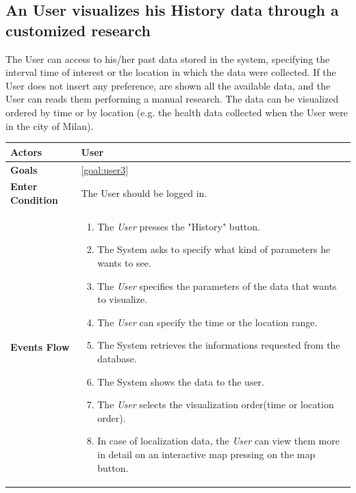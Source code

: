  \subsection{An User visualizes his History data through a customized research}
 
The User can access to his/her past data stored in the system, specifying the interval time of interest or the location in which the data were collected. If the User does not insert any preference, are shown all the available data, and the User can reads them performing a manual research.
The data can be visualized ordered by time or by location (e.g. the health data collected when the User were in the city of Milan).

\begin{table}[H]
	\centering
    
    \begin{tabular}{|p{3.5cm}|p{10.3cm}|}
    
    \hline
    \textbf{\large{Actors}} & User \\		 			
    \hline    \textbf{\large{Goals}} 				&\ref{goal:user3}\\
    
     \hline
     
    \textbf{\large{Enter Condition}} & The User should be logged in.\\
    
    \hline
    \textbf{\large{Events Flow}}		& \begin{enumerate}[leftmargin=0.5cm]
                                          	\item The \emph{User}  presses the "History" button.
                                            \item The System asks to specify what kind of parameters he wants to see.
                                            \item The \emph{User} specifies the parameters of the data that wants to visualize.
                                            \item The \emph{User} can specify the time or the location range. 
                                            \item The System retrieves the informations requested from the database.
                                            \item The System shows the data to the user.
                                            \item The \emph{User} selects the visualization order(time or location order).
                                            \item In case of localization data, the \emph{User} can view them more in detail on an interactive map pressing on the map button.            \end{enumerate}\\
                                            

\end{tabular}
\end{table}

